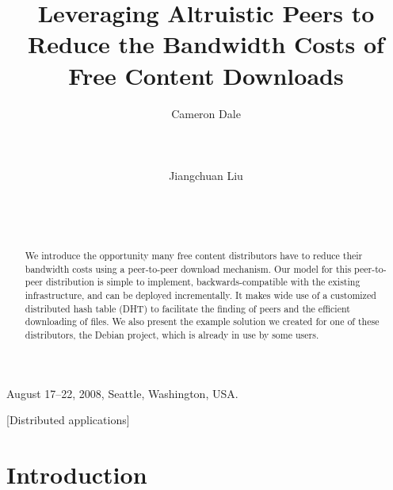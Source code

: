\documentclass{sig-alt-release2}
\begin{document}
 {August 17--22, 2008, Seattle, Washington, USA.} 

\title{Leveraging Altruistic Peers to Reduce the Bandwidth Costs of Free Content Downloads}
\author{
\alignauthor Cameron Dale\\
	\\
	\\
	\\
\alignauthor Jiangchuan Liu\\
	\\
	\\
	\\
}

\maketitle

\begin{abstract}
We introduce the opportunity many free content distributors have to
reduce their bandwidth costs using a peer-to-peer download
mechanism. Our model for this peer-to-peer distribution is simple to
implement, backwards-compatible with the existing infrastructure,
and can be deployed incrementally. It makes wide use of a customized
distributed hash table (DHT) to facilitate the finding of peers and
the efficient downloading of files. We also present the example
solution we created for one of these distributors, the Debian
project, which is already in use by some users.
\end{abstract}

[Distributed applications]

\section{Introduction}
\label{intro}
\end{document}
